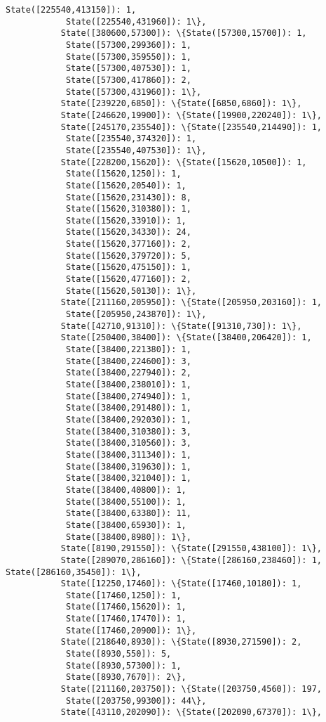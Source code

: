 \documentclass[11pt]{article}
\begin{document}
\begin{Verbatim}[commandchars=\\\{\}]
            State([225540,413150]): 1,
            State([225540,431960]): 1\},
           State([380600,57300]): \{State([57300,15700]): 1,
            State([57300,299360]): 1,
            State([57300,359550]): 1,
            State([57300,407530]): 1,
            State([57300,417860]): 2,
            State([57300,431960]): 1\},
           State([239220,6850]): \{State([6850,6860]): 1\},
           State([246620,19900]): \{State([19900,220240]): 1\},
           State([245170,235540]): \{State([235540,214490]): 1,
            State([235540,374320]): 1,
            State([235540,407530]): 1\},
           State([228200,15620]): \{State([15620,10500]): 1,
            State([15620,1250]): 1,
            State([15620,20540]): 1,
            State([15620,231430]): 8,
            State([15620,310380]): 1,
            State([15620,33910]): 1,
            State([15620,34330]): 24,
            State([15620,377160]): 2,
            State([15620,379720]): 5,
            State([15620,475150]): 1,
            State([15620,477160]): 2,
            State([15620,50130]): 1\},
           State([211160,205950]): \{State([205950,203160]): 1,
            State([205950,243870]): 1\},
           State([42710,91310]): \{State([91310,730]): 1\},
           State([250400,38400]): \{State([38400,206420]): 1,
            State([38400,221380]): 1,
            State([38400,224600]): 3,
            State([38400,227940]): 2,
            State([38400,238010]): 1,
            State([38400,274940]): 1,
            State([38400,291480]): 1,
            State([38400,292030]): 1,
            State([38400,310380]): 3,
            State([38400,310560]): 3,
            State([38400,311340]): 1,
            State([38400,319630]): 1,
            State([38400,321040]): 1,
            State([38400,40800]): 1,
            State([38400,55100]): 1,
            State([38400,63380]): 11,
            State([38400,65930]): 1,
            State([38400,8980]): 1\},
           State([8190,291550]): \{State([291550,438100]): 1\},
           State([289070,286160]): \{State([286160,238460]): 1, State([286160,35450]): 1\},
           State([12250,17460]): \{State([17460,10180]): 1,
            State([17460,1250]): 1,
            State([17460,15620]): 1,
            State([17460,17470]): 1,
            State([17460,20900]): 1\},
           State([218640,8930]): \{State([8930,271590]): 2,
            State([8930,550]): 5,
            State([8930,57300]): 1,
            State([8930,7670]): 2\},
           State([211160,203750]): \{State([203750,4560]): 197,
            State([203750,99300]): 44\},
           State([43110,202090]): \{State([202090,67370]): 1\},

\end{Verbatim}
\end{document}
